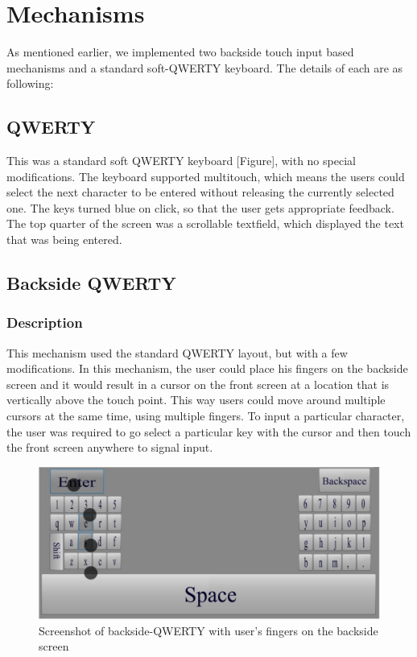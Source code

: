 \section{Mechanisms}

As mentioned earlier, we implemented two backside touch input based
mechanisms and a standard soft-QWERTY keyboard. The details of each
are as following:

\subsection{QWERTY}

This was a standard soft QWERTY keyboard [Figure], with no special
modifications. The keyboard supported multitouch, which means the
users could select the next character to be entered without releasing
the currently selected one. The keys turned blue on click, so that the
user gets appropriate feedback. The top quarter of the screen was a
scrollable textfield, which displayed the text that was being entered.

\subsection{Backside QWERTY}
\subsubsection{Description}

This mechanism used the standard QWERTY layout, but with a few
modifications. In this mechanism, the user could place his fingers on
the backside screen and it would result in a cursor on the front
screen at a location that is vertically above the touch point. This
way users could move around multiple cursors at the same time, using
multiple fingers. To input a particular character, the user was
required to go select a particular key with the cursor and then touch
the front screen anywhere to signal input.

\begin{figure}
    \includegraphics[scale=0.45]{Figures/backside.pdf} 
    \caption{Screenshot of backside-QWERTY with user's fingers on the
      backside screen}
\end{figure}

